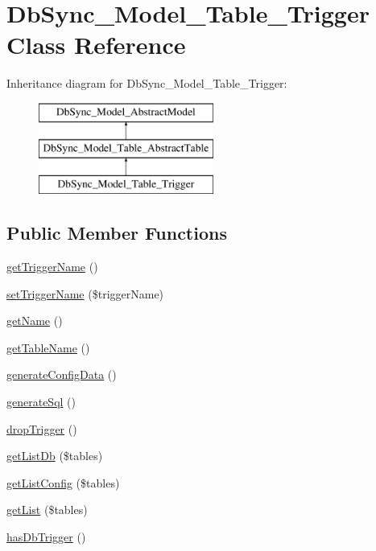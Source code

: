 \hypertarget{classDbSync__Model__Table__Trigger}{
\section{DbSync\_\-Model\_\-Table\_\-Trigger Class Reference}
\label{classDbSync__Model__Table__Trigger}
}
Inheritance diagram for DbSync\_\-Model\_\-Table\_\-Trigger:\begin{figure}[H]
\begin{center}
\leavevmode
\includegraphics[height=3.000000cm]{classDbSync__Model__Table__Trigger}
\end{center}
\end{figure}
\subsection*{Public Member Functions}
\begin{DoxyCompactItemize}
\item 
\hyperlink{classDbSync__Model__Table__Trigger_a997b0c6e7fea55d82c515efabd6248e1}{getTriggerName} ()
\item 
\hyperlink{classDbSync__Model__Table__Trigger_a65fb6390628a66a3427966a012e1a90d}{setTriggerName} (\$triggerName)
\item 
\hyperlink{classDbSync__Model__Table__Trigger_a82965dc7d44b8c3722b4830c6c7cc7ea}{getName} ()
\item 
\hyperlink{classDbSync__Model__Table__Trigger_a8b13bee47b742b987a07533dba66da76}{getTableName} ()
\item 
\hyperlink{classDbSync__Model__Table__Trigger_aee02868e4b67cd7df75e7a2e1d7a354f}{generateConfigData} ()
\item 
\hyperlink{classDbSync__Model__Table__Trigger_a97d3977f816145195c174e8c460652b6}{generateSql} ()
\item 
\hyperlink{classDbSync__Model__Table__Trigger_abfa0a80448a4a9c5eb22dafe24d75697}{dropTrigger} ()
\item 
\hyperlink{classDbSync__Model__Table__Trigger_a7e5d9106415d0be267a1200851f780a5}{getListDb} (\$tables)
\item 
\hyperlink{classDbSync__Model__Table__Trigger_a90b0638071521cb7aa66eb69e651dd81}{getListConfig} (\$tables)
\item 
\hyperlink{classDbSync__Model__Table__Trigger_ae0731c9fbb1b7c293e05ca05af4ca2aa}{getList} (\$tables)
\item 
\hyperlink{classDbSync__Model__Table__Trigger_acaf99517d87453f4383ea37421ddf3b5}{hasDbTrigger} ()
\end{DoxyCompactItemize}
